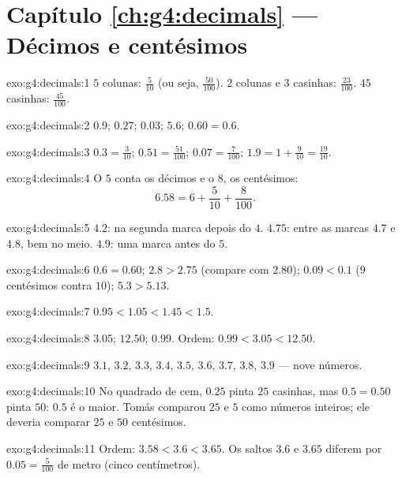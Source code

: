 \section*{Capítulo \ref{ch:g4:decimals} --- Décimos e centésimos}

\begin{solution}{exo:g4:decimals:1}
$5$ colunas: $\frac{5}{10}$ (ou seja, $\frac{50}{100}$). $2$ colunas
e $3$ casinhas: $\frac{23}{100}$. $45$ casinhas: $\frac{45}{100}$.
\end{solution}

\begin{solution}{exo:g4:decimals:2}
$0.9$; \quad $0.27$; \quad $0.03$; \quad $5.6$; \quad
$0.60 = 0.6$.
\end{solution}

\begin{solution}{exo:g4:decimals:3}
$0.3 = \frac{3}{10}$; \quad $0.51 = \frac{51}{100}$; \quad
$0.07 = \frac{7}{100}$; \quad $1.9 = 1 + \frac{9}{10} =
\frac{19}{10}$.
\end{solution}

\begin{solution}{exo:g4:decimals:4}
O $5$ conta os décimos e o $8$, os centésimos:
\[
6.58 = 6 + \frac{5}{10} + \frac{8}{100}.
\]
\end{solution}

\begin{solution}{exo:g4:decimals:5}
$4.2$: na segunda marca depois do $4$. $4.75$: entre as marcas $4.7$
e $4.8$, bem no meio. $4.9$: uma marca antes do $5$.
\end{solution}

\begin{solution}{exo:g4:decimals:6}
$0.6 = 0.60$; \quad $2.8 > 2.75$ (compare com $2.80$); \quad
$0.09 < 0.1$ ($9$ centésimos contra $10$); \quad
$5.3 > 5.13$.
\end{solution}

\begin{solution}{exo:g4:decimals:7}
$0.95 < 1.05 < 1.45 < 1.5$.
\end{solution}

\begin{solution}{exo:g4:decimals:8}
$3.05$; \quad $12.50$; \quad $0.99$. Ordem:
$0.99 < 3.05 < 12.50$.
\end{solution}

\begin{solution}{exo:g4:decimals:9}
$3.1$, $3.2$, $3.3$, $3.4$, $3.5$, $3.6$, $3.7$, $3.8$, $3.9$ ---
nove números.
\end{solution}

\begin{solution}{exo:g4:decimals:10}
No quadrado de cem, $0.25$ pinta $25$ casinhas, mas $0.5 = 0.50$
pinta $50$: $0.5$ é o maior. Tomás comparou $25$ e $5$ como números
inteiros; ele deveria comparar $25$ e $50$ centésimos.
\end{solution}

\begin{solution}{exo:g4:decimals:11}
Ordem: $3.58 < 3.6 < 3.65$. Os saltos $3.6$ e $3.65$ diferem por
$0.05 = \frac{5}{100}$ de metro (cinco centímetros).
\end{solution}
